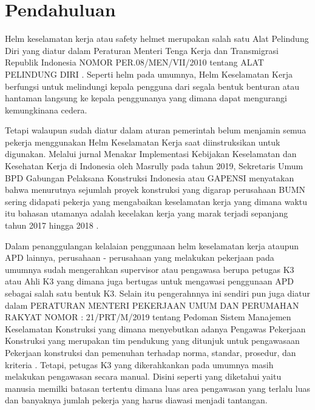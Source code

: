 \section{Pendahuluan}
\label{sec:introduction}


\par Helm keselamatan kerja atau safety helmet merupakan salah satu Alat Pelindung Diri yang diatur dalam 
Peraturan Menteri Tenga Kerja dan Transmigrasi Republik Indonesia NOMOR PER.08/MEN/VII/2010 tentang ALAT PELINDUNG DIRI \cite{suratkementriantenagakerja}. Seperti helm pada umumnya, Helm Keselamatan Kerja berfungsi untuk melindungi kepala pengguna dari segala bentuk benturan atau hantaman langsung ke kepala penggunanya yang dimana dapat mengurangi kemungkinana cedera.

\par Tetapi walaupun sudah diatur dalam aturan pemerintah belum menjamin semua pekerja menggunakan Helm Keselamatan Kerja saat diinstruksikan untuk digunakan. Melalui jurnal Menakar Implementasi Kebijakan Keselamatan dan Kesehatan Kerja di Indonesia oleh Masrully pada tahun 2019, Sekretaris Umum BPD Gabungan Pelaksana Konstruksi Indonesia atau GAPENSI menyatakan bahwa menurutnya sejumlah proyek konstruksi yang digarap perusahaan BUMN sering didapati pekerja yang mengabaikan keselamatan kerja yang dimana waktu itu bahasan utamanya adalah kecelakan kerja yang marak terjadi sepanjang tahun 2017 hingga 2018 \cite{masrully2019menakar}.

\par Dalam penanggulangan kelalaian penggunaan helm keselamatan kerja ataupun APD lainnya, perusahaan - perusahaan yang melakukan pekerjaan pada umumnya sudah mengerahkan supervisor atau pengawasa berupa petugas K3 atau Ahli K3 yang dimana juga bertugas untuk mengawasi penggunaan APD sebagai salah satu bentuk K3. Selain itu pengerahnnya  ini sendiri pun juga diatur dalam PERATURAN MENTERI PEKERJAAN UMUM DAN PERUMAHAN RAKYAT NOMOR : 21/PRT/M/2019 tentang Pedoman Sistem Manajemen Keselamatan Konstruksi yang dimana menyebutkan adanya Pengawas Pekerjaan Konstruksi yang merupakan tim pendukung yang ditunjuk untuk pengawasaan Pekerjaan konstruksi dan pemenuhan terhadap norma, standar, prosedur, dan kriteria \cite{permen21prtm2019pedomansistemmanajemenkeselamatankonstruksi}. Tetapi, petugas K3 yang dikerahkankan pada umumnya masih melakukan pengawasan secara manual. Disini seperti yang diketahui yaitu manusia memilki batasan tertentu dimana luas area pengawasan yang terlalu luas dan banyaknya jumlah pekerja yang harus diawasi menjadi tantangan.



